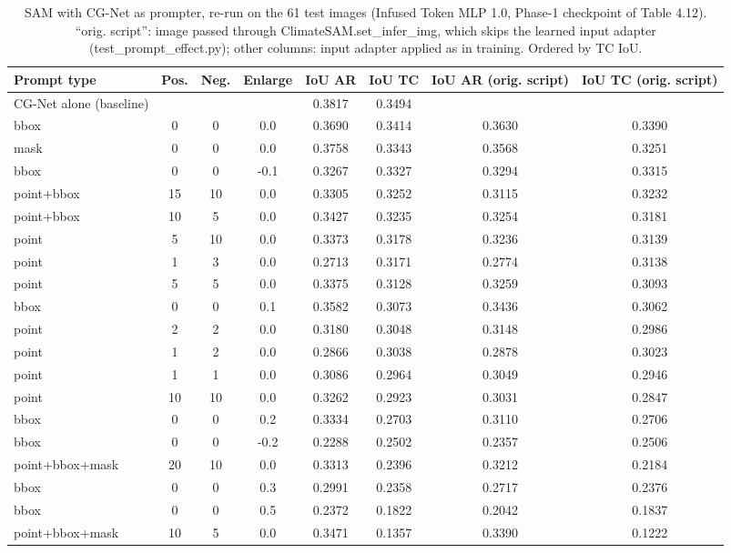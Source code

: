 \begin{table}[htbp]
\centering
\small
\begin{adjustbox}{max width=\linewidth}
\begin{tabular}{lccccccc}
\toprule
Prompt type & Pos. & Neg. & Enlarge & IoU AR & IoU TC & IoU AR (orig. script) & IoU TC (orig. script) \\
\midrule
CG-Net alone (baseline) &  &  &  & 0.3817 & 0.3494 &  &  \\
\midrule
bbox & 0 & 0 & 0.0 & 0.3690 & 0.3414 & 0.3630 & 0.3390 \\
mask & 0 & 0 & 0.0 & 0.3758 & 0.3343 & 0.3568 & 0.3251 \\
bbox & 0 & 0 & -0.1 & 0.3267 & 0.3327 & 0.3294 & 0.3315 \\
point+bbox & 15 & 10 & 0.0 & 0.3305 & 0.3252 & 0.3115 & 0.3232 \\
point+bbox & 10 & 5 & 0.0 & 0.3427 & 0.3235 & 0.3254 & 0.3181 \\
point & 5 & 10 & 0.0 & 0.3373 & 0.3178 & 0.3236 & 0.3139 \\
point & 1 & 3 & 0.0 & 0.2713 & 0.3171 & 0.2774 & 0.3138 \\
point & 5 & 5 & 0.0 & 0.3375 & 0.3128 & 0.3259 & 0.3093 \\
bbox & 0 & 0 & 0.1 & 0.3582 & 0.3073 & 0.3436 & 0.3062 \\
point & 2 & 2 & 0.0 & 0.3180 & 0.3048 & 0.3148 & 0.2986 \\
point & 1 & 2 & 0.0 & 0.2866 & 0.3038 & 0.2878 & 0.3023 \\
point & 1 & 1 & 0.0 & 0.3086 & 0.2964 & 0.3049 & 0.2946 \\
point & 10 & 10 & 0.0 & 0.3262 & 0.2923 & 0.3031 & 0.2847 \\
bbox & 0 & 0 & 0.2 & 0.3334 & 0.2703 & 0.3110 & 0.2706 \\
bbox & 0 & 0 & -0.2 & 0.2288 & 0.2502 & 0.2357 & 0.2506 \\
point+bbox+mask & 20 & 10 & 0.0 & 0.3313 & 0.2396 & 0.3212 & 0.2184 \\
bbox & 0 & 0 & 0.3 & 0.2991 & 0.2358 & 0.2717 & 0.2376 \\
bbox & 0 & 0 & 0.5 & 0.2372 & 0.1822 & 0.2042 & 0.1837 \\
point+bbox+mask & 10 & 5 & 0.0 & 0.3471 & 0.1357 & 0.3390 & 0.1222 \\
\bottomrule
\end{tabular}
\end{adjustbox}
\caption{SAM with CG-Net as prompter, re-run on the 61 test images (Infused Token MLP 1.0, Phase-1 checkpoint of Table 4.12). ``orig. script'': image passed through ClimateSAM.set\_infer\_img, which skips the learned input adapter (test\_prompt\_effect.py); other columns: input adapter applied as in training. Ordered by TC IoU.}
\label{tab:cgnet_prompter_corrected}
\end{table}
